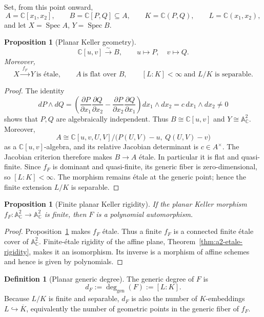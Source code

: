 \documentclass[11pt]{article}
\newtheorem{proposition}[theorem]{Proposition}
\theoremstyle{remark}
\theoremstyle{definition}
\newtheorem{definition}[theorem]{Definition}
\DeclareMathOperator{\Spec}{Spec}
\newcommand{\A}{\mathbb A}
\newcommand{\C}{\mathbb C}
\begin{document}
Set, from this point onward,
\[
  A=\C[x_1,x_2],
  \qquad
  B=\C[P,Q]\subseteq A,
  \qquad
  K=\C(P,Q),
  \qquad
  L=\C(x_1,x_2),
\]
and let \(X=\Spec A\), \(Y=\Spec B\).

\begin{proposition}[Planar Keller geometry]
\label{prop:planar-keller-local-geometry}
\[
  \C[u,v]\xrightarrow{\sim}B,
  \qquad
  u\longmapsto P,\quad v\longmapsto Q.
\]
Moreover,
\[
  X\xrightarrow{\ f_F\ }Y\ \text{is \'etale},
  \qquad
  A\ \text{is flat over }B,
  \qquad
  [L:K]<\infty
  \ \text{and }L/K\text{ is separable}.
\]
\end{proposition}

\begin{proof}
The identity
\[
  dP\wedge dQ
  =
  \left(
    \frac{\partial P}{\partial x_1}
    \frac{\partial Q}{\partial x_2}
    -
    \frac{\partial P}{\partial x_2}
    \frac{\partial Q}{\partial x_1}
  \right)dx_1\wedge dx_2
  =
  c\,dx_1\wedge dx_2
  \neq0
\]
shows that \(P,Q\) are algebraically independent.  Thus
\(B\cong\C[u,v]\) and \(Y\cong\A^2_{\C}\).  Moreover,
\[
  A
  \cong
  \C[u,v,U,V]\big/\bigl(P(U,V)-u,\ Q(U,V)-v\bigr)
\]
as a \(\C[u,v]\)-algebra, and its relative Jacobian determinant is
\(c\in A^\times\).  The
Jacobian criterion therefore makes \(B\to A\) \'etale.  In particular
it is flat and quasi-finite.  Since \(f_F\) is dominant and
quasi-finite, its generic fiber is zero-dimensional, so
\([L:K]<\infty\).  The morphism remains \'etale at the generic point;
hence the finite extension \(L/K\) is separable.
\end{proof}

\begin{proposition}[Finite planar Keller rigidity]
\label{prop:finite-planar-keller-rigidity}
If the planar Keller morphism
\(f_F\colon\A^2_{\C}\to\A^2_{\C}\) is finite, then \(F\) is a
polynomial automorphism.
\end{proposition}

\begin{proof}
Proposition~\ref{prop:planar-keller-local-geometry} makes \(f_F\) \'etale.
Thus a finite \(f_F\) is a connected finite \'etale cover of
\(\A^2_{\C}\).  Finite-\'etale rigidity of the affine plane,
Theorem~\ref{thm:a2-etale-rigidity}, makes it an isomorphism.  Its inverse
is a morphism of affine schemes and hence is given by polynomials.
\end{proof}

\begin{definition}[Planar generic degree]
\label{def:planar-generic-degree}
The generic degree of \(F\) is
\[
  d_F:=\deg_{\mathrm{gen}}(F):=[L:K].
\]
Because \(L/K\) is finite and separable, \(d_F\) is also the number of
\(K\)-embeddings \(L\hookrightarrow\overline K\), equivalently the number
of geometric points in the generic fiber of \(f_F\).
\end{definition}
\end{document}
